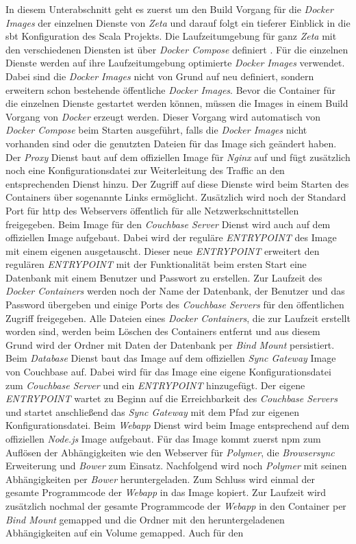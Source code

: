 In diesem Unterabschnitt geht es zuerst um den Build Vorgang für die \textit{Docker Images} der einzelnen Dienste von \textit{Zeta} und darauf folgt ein tieferer Einblick in die \ac{sbt} Konfiguration des Scala Projekts. Die Laufzeitumgebung für ganz \textit{Zeta} mit den verschiedenen Diensten ist über \textit{Docker Compose} definiert \cite{zeta_docker_compose}. Für die einzelnen Dienste werden auf ihre Laufzeitumgebung optimierte \textit{Docker Images} verwendet. Dabei sind die \textit{Docker Images} nicht von Grund auf neu definiert, sondern erweitern schon bestehende öffentliche \textit{Docker Images}. Bevor die Container für die einzelnen Dienste gestartet werden können, müssen die Images in einem Build Vorgang von \textit{Docker} erzeugt werden. Dieser Vorgang wird automatisch von \textit{Docker Compose} beim Starten ausgeführt, falls die \textit{Docker Images} nicht vorhanden sind oder die genutzten Dateien für das Image sich geändert haben. Der \textit{Proxy} Dienst baut auf dem offiziellen Image für \textit{Nginx} auf und fügt zusätzlich noch eine Konfigurationsdatei zur Weiterleitung des Traffic an den entsprechenden Dienst hinzu. Der Zugriff auf diese Dienste wird beim Starten des Containers über sogenannte Links ermöglicht. Zusätzlich wird noch der Standard Port für \ac{http} des Webservers öffentlich für alle Netzwerkschnittstellen freigegeben. Beim Image für den \textit{Couchbase Server} Dienst wird auch auf dem offiziellen Image aufgebaut. Dabei wird der reguläre \textit{ENTRYPOINT} des Image mit einem eigenen ausgetauscht. Dieser neue \textit{ENTRYPOINT} erweitert den regulären \textit{ENTRYPOINT} mit der Funktionalität beim ersten Start eine Datenbank mit einem Benutzer und Passwort zu erstellen. Zur Laufzeit des \textit{Docker Containers} werden noch der Name der Datenbank, der Benutzer und das Password übergeben und einige Ports des \textit{Couchbase Servers} für den öffentlichen Zugriff freigegeben. Alle Dateien eines \textit{Docker Containers}, die zur Laufzeit erstellt worden sind, werden beim Löschen des Containers entfernt und aus diesem Grund wird der Ordner mit Daten der Datenbank per \textit{Bind Mount} persistiert. Beim \textit{Database} Dienst baut das Image auf dem offiziellen \textit{Sync Gateway} Image von Couchbase auf. Dabei wird für das Image eine eigene Konfigurationsdatei zum \textit{Couchbase Server} und ein \textit{ENTRYPOINT} hinzugefügt. Der eigene \textit{ENTRYPOINT} wartet zu Beginn auf die Erreichbarkeit des \textit{Couchbase Servers} und startet anschließend das \textit{Sync Gateway} mit dem Pfad zur eigenen Konfigurationsdatei. Beim \textit{Webapp} Dienst wird beim Image entsprechend auf dem  offiziellen \textit{Node.js} Image aufgebaut. Für das Image kommt zuerst \ac{npm} zum Auflösen der Abhängigkeiten wie den Webserver für \textit{Polymer}, die \textit{Browsersync} Erweiterung und \textit{Bower} zum Einsatz. Nachfolgend wird noch \textit{Polymer} mit seinen Abhängigkeiten per \textit{Bower} heruntergeladen. Zum Schluss wird einmal der gesamte Programmcode der \textit{Webapp} in das Image kopiert. Zur Laufzeit wird zusätzlich nochmal der gesamte Programmcode der \textit{Webapp} in den Container per \textit{Bind Mount} gemapped und die Ordner mit den heruntergeladenen Abhängigkeiten auf ein Volume gemapped. Auch für den 
